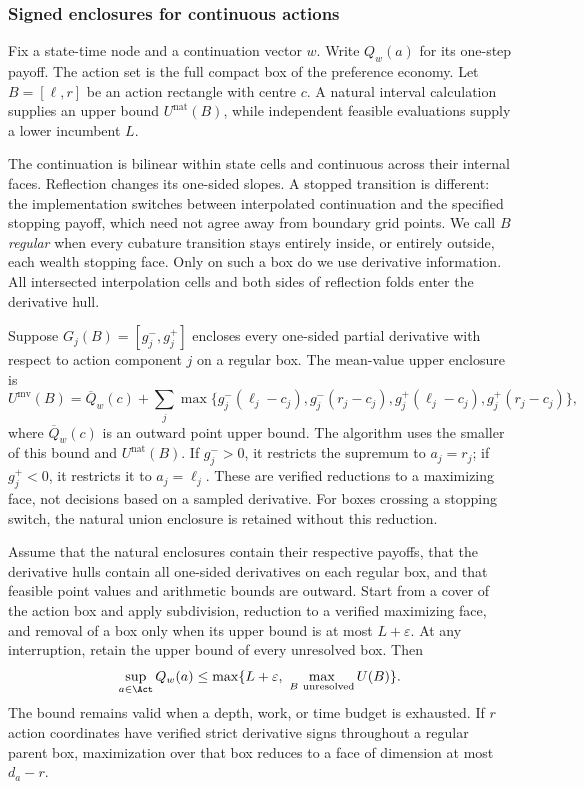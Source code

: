 \subsubsection{Signed enclosures for continuous actions}
Fix a state-time node and a continuation vector $w$. Write $Q_w(a)$ for its one-step payoff. The action set is the full compact box of the preference economy. Let $B=[\ell,r]$ be an action rectangle with centre $c$. A natural interval calculation supplies an upper bound $U^{\mathrm{nat}}(B)$, while independent feasible evaluations supply a lower incumbent $L$.

The continuation is bilinear within state cells and continuous across their internal faces. Reflection changes its one-sided slopes. A stopped transition is different: the implementation switches between interpolated continuation and the specified stopping payoff, which need not agree away from boundary grid points. We call $B$ \emph{regular} when every cubature transition stays entirely inside, or entirely outside, each wealth stopping face. Only on such a box do we use derivative information. All intersected interpolation cells and both sides of reflection folds enter the derivative hull.

Suppose $G_j(B)=[g_j^-,g_j^+]$ encloses every one-sided partial derivative with respect to action component $j$ on a regular box. The mean-value upper enclosure is
\begin{equation}\label{eq:r9mean}
 U^{\mathrm{mv}}(B)=\overline Q_w(c)+
 \sum_j\max\{g_j^-(\ell_j-c_j),g_j^-(r_j-c_j),g_j^+(\ell_j-c_j),g_j^+(r_j-c_j)\},
\end{equation}
where $\overline Q_w(c)$ is an outward point upper bound. The algorithm uses the smaller of this bound and $U^{\mathrm{nat}}(B)$. If $g_j^->0$, it restricts the supremum to $a_j=r_j$; if $g_j^+<0$, it restricts it to $a_j=\ell_j$. These are verified reductions to a maximizing face, not decisions based on a sampled derivative. For boxes crossing a stopping switch, the natural union enclosure is retained without this reduction.

\begin{theorem}\label{thm:r9cover}
Assume that the natural enclosures contain their respective payoffs, that the derivative hulls contain all one-sided derivatives on each regular box, and that feasible point values and arithmetic bounds are outward. Start from a cover of the action box and apply subdivision, reduction to a verified maximizing face, and removal of a box only when its upper bound is at most $L+\varepsilon$. At any interruption, retain the upper bound of every unresolved box. Then
\begin{equation}\label{eq:r9coverbound}
 \sup_{a\in\Act}Q_w(a)\leq\max\{L+\varepsilon,\ \max_{B\ \mathrm{unresolved}}U(B)\}.
\end{equation}
The bound remains valid when a depth, work, or time budget is exhausted. If $r$ action coordinates have verified strict derivative signs throughout a regular parent box, maximization over that box reduces to a face of dimension at most $d_a-r$.
\end{theorem}

